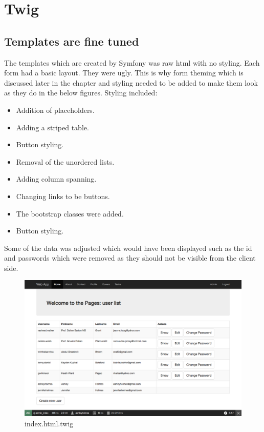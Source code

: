 \section{Twig}

\subsection{Templates are fine tuned}

The templates which are created by Symfony was raw html with no styling. Each form had a basic layout. They were ugly. This is why form theming which is discussed later in the chapter and styling needed to be added to make them look as they do in the below figures. Styling included:

\begin{itemize}
  \item Addition of placeholders.
    \item Adding a striped table.
      \item Button styling.
        \item Removal of the unordered lists.
          \item Adding column spanning.
            \item Changing links to be buttons.
              \item The bootstrap classes were added.
                \item Button styling.     
\end{itemize}

Some of the data was adjusted which would have been displayed such as the id and passwords which were removed as they should not be visible from the client side.

\begin{figure}[htbp]
   \centering
   \includegraphics[width=400pt]{figures/index_html_twig.png} %
   \caption{index.html.twig}
   \label{fig:index.html.twig}
\end{figure}


